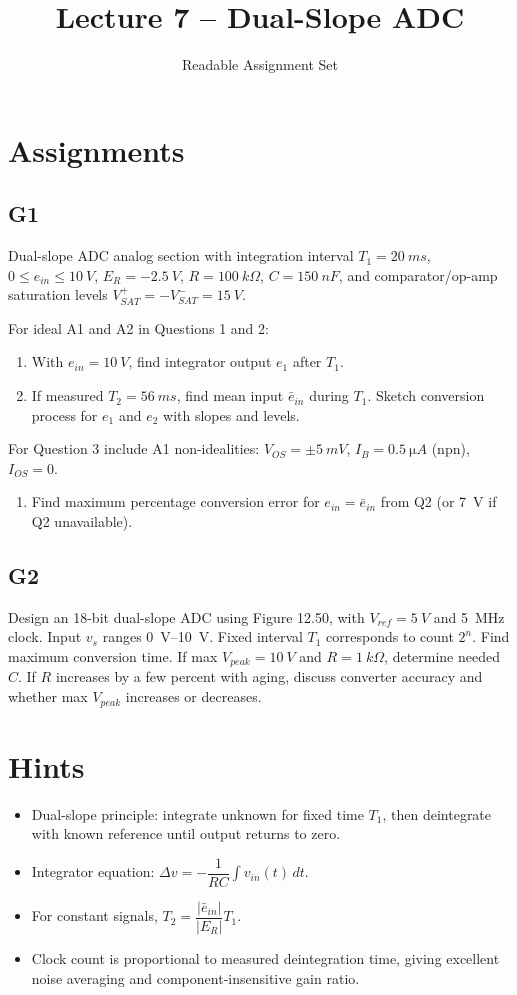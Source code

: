 \documentclass[12pt,a4paper]{article}
\title{Lecture 7 -- Dual-Slope ADC}
\author{Readable Assignment Set}
\date{}
\begin{document}
\maketitle
\tableofcontents

\section{Assignments}
\subsection{G1}
Dual-slope ADC analog section with integration interval $T_1=\SI{20}{ms}$,
$0\le e_{in}\le\SI{10}{V}$,
$E_R=\SI{-2.5}{V}$,
$R=\SI{100}{k\Omega}$,
$C=\SI{150}{nF}$,
and comparator/op-amp saturation levels $V_{SAT}^+=-V_{SAT}^-=\SI{15}{V}$.

For ideal A1 and A2 in Questions 1 and 2:
\begin{enumerate}
\item With $e_{in}=\SI{10}{V}$, find integrator output $e_1$ after $T_1$.
\item If measured $T_2=\SI{56}{ms}$, find mean input $\bar e_{in}$ during $T_1$. Sketch conversion process for $e_1$ and $e_2$ with slopes and levels.
\end{enumerate}
For Question 3 include A1 non-idealities: $V_{OS}=\pm\SI{5}{mV}$, $I_B=\SI{0.5}{\micro A}$ (npn), $I_{OS}=0$.
\begin{enumerate}[resume]
\item Find maximum percentage conversion error for $e_{in}=\bar e_{in}$ from Q2 (or \SI{7}{V} if Q2 unavailable).
\end{enumerate}

\subsection{G2}
Design an 18-bit dual-slope ADC using Figure 12.50, with $V_{ref}=\SI{5}{V}$ and \SI{5}{MHz} clock. Input $v_s$ ranges \SIrange{0}{10}{V}. Fixed interval $T_1$ corresponds to count $2^n$.
Find maximum conversion time. If max $V_{peak}=\SI{10}{V}$ and $R=\SI{1}{k\Omega}$, determine needed $C$. If $R$ increases by a few percent with aging, discuss converter accuracy and whether max $V_{peak}$ increases or decreases.

\section{Hints}
\begin{itemize}
\item Dual-slope principle: integrate unknown for fixed time $T_1$, then deintegrate with known reference until output returns to zero.
\item Integrator equation: $\Delta v = -\dfrac{1}{RC}\int v_{in}(t)\,dt$.
\item For constant signals, $T_2=\dfrac{|\bar e_{in}|}{|E_R|}T_1$.
\item Clock count is proportional to measured deintegration time, giving excellent noise averaging and component-insensitive gain ratio.
\end{itemize}
\end{document}
